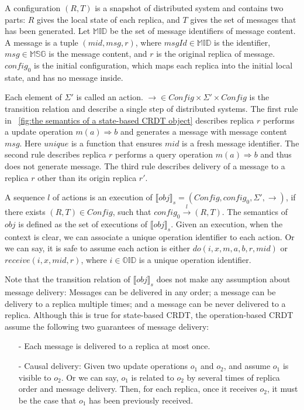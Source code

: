 A configuration $(R,T)$ is a snapshot of distributed system and contains two parts: $R$ gives the local state of each replica, and $T$ gives the set of messages that has been generated. Let $\mathbb{MID}$ be the set of message identifiers of message content. A message is a tuple $(\mathit{mid},\mathit{msg},r)$, where $\mathit{msgId} \in \mathbb{MID}$ is the identifier, $\mathit{msg} \in \mathbb{MSG}$ is the message content, and $r$ is the original replica of message. $\mathit{config}_0$ is the initial configuration, which maps each replica into the initial local state, and has no message inside.

Each element of $\Sigma'$ is called an action. $\rightarrow \in \mathit{Config} \times \Sigma' \times \mathit{Config}$ is the transition relation and describe a single step of distributed systems. The first rule in \figurename~\ref{fig:the semantics of a state-based CRDT object} describes replica $r$ performs a update operation $m(a) \Rightarrow b$ and generates a message with message content $\mathit{msg}$. Here $\mathit{unique}$ is a function that ensures $\mathit{mid}$ is a fresh message identifier. The second rule describes replica $r$ performs a query operation $m(a) \Rightarrow b$ and thus does not generate message. The third rule describes delivery of a message to a replica $r$ other than its origin replica $r'$. 

A sequence $l$ of actions is an execution of $\llbracket \mathit{obj} \rrbracket_s = (\mathit{Config},\mathit{config}_0,\Sigma',\rightarrow)$, if there exists $(R,T) \in \mathit{Config}$, such that $\mathit{config}_0 {\xrightarrow{ l }} (R,T)$. The semantics of $\mathit{obj}$ is defined as the set of executions of $\llbracket \mathit{obj} \rrbracket_s$. Given an execution, when the context is clear, we can associate a unique operation identifier to each action. Or we can say, it is safe to assume each action is either $\mathit{do}(i,x,m,a,b,r,\mathit{mid})$ or $\mathit{receive}(i,x,\mathit{mid},r)$, where $i \in \mathbb{OID}$ is a unique operation identifier.

Note that the transition relation of $\llbracket \mathit{obj} \rrbracket_s$ does not make any assumption about message delivery: Messages can be delivered in any order; a message can be delivery to a replica multiple times; and a message can be never delivered to a replica. Although this is true for state-based CRDT, the operation-based CRDT assume the following two guarantees of message delivery:

\begin{itemize}
\setlength{\itemsep}{0.5pt}
\item[-] Each message is delivered to a replica at most once.
\item[-] Causal delivery: Given two update operations $o_1$ and $o_2$, and assume $o_1$ is visible to $o_2$. Or we can say, $o_1$ is related to $o_2$ by several times of replica order and message delivery. Then, for each replica, once it receives $o_2$, it must be the case that $o_1$ has been previously received. 
\end{itemize} 

